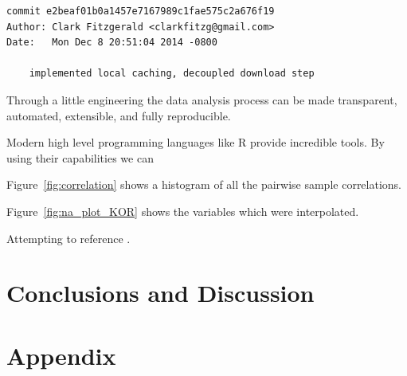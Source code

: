 \documentclass[12pt]{article}
\begin{document}
\begin{verbatim}
commit e2beaf01b0a1457e7167989c1fae575c2a676f19
Author: Clark Fitzgerald <clarkfitzg@gmail.com>
Date:   Mon Dec 8 20:51:04 2014 -0800

    implemented local caching, decoupled download step
\end{verbatim}

Through a little engineering the data analysis process
can be made transparent, automated, extensible, and fully reproducible.

Modern high level programming languages like R provide incredible tools. By
using their capabilities we can 

Figure~\ref{fig:correlation} shows a histogram of all the pairwise sample
correlations.

Figure~\ref{fig:na_plot_KOR} shows the variables which were interpolated.

Attempting to reference \cite{lamport94}.

\section{Conclusions and Discussion}


\newpage
\section{Appendix}

\listoffigures
\end{document}
